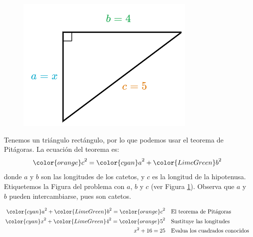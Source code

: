 \begin{minipage}[t][][t]{0.6\textwidth}
    \begin{solutionbox}{9cm}
        \begin{minipage}{0.4\textwidth}
            \begin{figure}[H]
                \centering
                \includegraphics[width=0.9\linewidth]{../images/lados_pitagoras_24a.png}
                \caption{}
                \label{fig:lados_pitagoras_24a}
            \end{figure}
        \end{minipage}\hfill
        \begin{minipage}{0.55\textwidth}
            Tenemos un triángulo rectángulo, por lo que podemos usar el teorema de Pitágoras.
            La ecuación del teorema es:
            \[{\color{orange}c}^2={\color{cyan}a}^2+{\color{LimeGreen}b}^2\]
            donde $a$ y $b$ son las longitudes de los catetos, y $c$ es la longitud de la hipotenusa.
            Etiquetemos la Figura del problema con $a$, $b$ y $c$ (ver Figura \ref{fig:lados_pitagoras_24a}).
            Observa que $a$ y $b$ pueden intercambiarse, pues son catetos.
        \end{minipage}
        \begin{align*}
            {\color{cyan}a}^2+{\color{LimeGreen}b}^2  ={\color{orange}c}^2 & \text{\quad El teorema de Pitágoras}                          \\
            {\color{cyan}x}^2+{\color{LimeGreen}4}^2  ={\color{orange}5}^2 & \text{\quad Sustituye las longitudes}                         \\
            x^2+16   =25                                                   & \text{\quad Evalua los cuadrados conocidos}                   \\

\end{align*}
\end{solutionbox}
\end{minipage}
